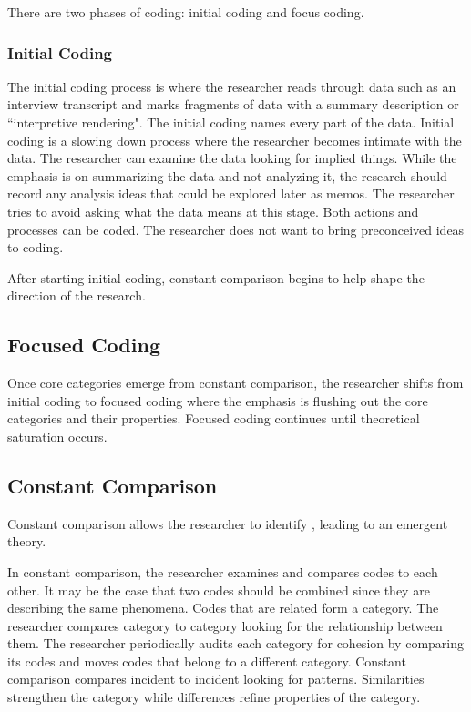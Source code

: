 There are two phases of coding: initial coding and focus coding. 

\subsubsection{Initial Coding}
The initial coding process is where the researcher reads through data such as an interview transcript and marks fragments of data with a summary description or ``interpretive rendering".  The initial coding names every part of the data.  Initial coding is a slowing down process where the researcher becomes intimate with the data. The researcher can examine the data looking for implied things. While the emphasis is on summarizing the data and not analyzing it, the research should record any analysis ideas that could be explored later as memos. The researcher tries to avoid asking what the data means at this stage. Both actions and processes can be coded. The researcher does not want to bring preconceived ideas to coding.

After starting initial coding, constant comparison begins to help shape the direction of the research. 
\subsection{Focused Coding}
Once core categories emerge from constant comparison, the researcher shifts from initial coding to focused coding where the emphasis is flushing out the core categories and their properties. Focused coding continues until theoretical saturation occurs.
\subsection{Constant Comparison}

Constant comparison allows the researcher to identify  \cite{GlaserBasics}, leading to an emergent theory.

In constant comparison, the researcher examines and compares codes to each other. It may be the case that two codes should be combined since they are describing the same phenomena. Codes that are related form a category. The researcher compares category to category looking for the relationship between them. The researcher periodically audits each category for cohesion by comparing its codes and moves codes that belong to a different category. Constant comparison compares incident to incident looking for patterns. Similarities strengthen the category while differences refine properties of the category. 

